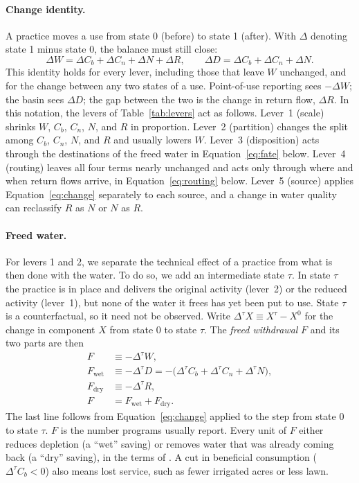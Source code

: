 \documentclass[11pt]{article}
\newcommand{\Cb}{C_b}                       %
\newcommand{\Cn}{C_n}                       %
\newcommand{\Fwet}{F_{\mathrm{wet}}}        %
\newcommand{\Fdry}{F_{\mathrm{dry}}}        %
\newcommand{\dtau}{\Delta^{\tau}}            %
\begin{document}
\paragraph{Change identity.} A practice moves a use from state 0 (before) to state 1 (after). With $\Delta$ denoting state 1 minus state 0, the balance must still close:
\begin{equation}\label{eq:change}
  \Delta W = \Delta \Cb + \Delta \Cn + \Delta N + \Delta R ,
  \qquad
  \Delta D = \Delta \Cb + \Delta \Cn + \Delta N .
\end{equation}
This identity holds for every lever, including those that leave $W$ unchanged, and for the change between any two states of a use. Point-of-use reporting sees $-\Delta W$; the basin sees $\Delta D$; the gap between the two is the change in return flow, $\Delta R$. In this notation, the levers of Table~\ref{tab:levers} act as follows. Lever~1 (scale) shrinks $W$, $\Cb$, $\Cn$, $N$, and $R$ in proportion. Lever~2 (partition) changes the split among $\Cb$, $\Cn$, $N$, and $R$ and usually lowers $W$. Lever~3 (disposition) acts through the destinations of the freed water in Equation~\eqref{eq:fate} below. Lever~4 (routing) leaves all four terms nearly unchanged and acts only through where and when return flows arrive, in Equation~\eqref{eq:routing} below. Lever~5 (source) applies Equation~\eqref{eq:change} separately to each source, and a change in water quality can reclassify $R$ as $N$ or $N$ as $R$.

\paragraph{Freed water.} For levers 1 and 2, we separate the technical effect of a practice from what is then done with the water. To do so, we add an intermediate state $\tau$. In state $\tau$ the practice is in place and delivers the original activity (lever~2) or the reduced activity (lever~1), but none of the water it frees has yet been put to use. State $\tau$ is a counterfactual, so it need not be observed. Write $\dtau X \equiv X^{\tau} - X^{0}$ for the change in component $X$ from state 0 to state $\tau$. The \emph{freed withdrawal} $F$ and its two parts are then
\begin{equation}\label{eq:freed}
\begin{aligned}
  F     &\equiv -\dtau W , \\
  \Fwet &\equiv -\dtau D = -\big(\dtau \Cb + \dtau \Cn + \dtau N\big) , \\
  \Fdry &\equiv -\dtau R , \\
  F     &= \Fwet + \Fdry .
\end{aligned}
\end{equation}
The last line follows from Equation~\eqref{eq:change} applied to the step from state 0 to state $\tau$. $F$ is the number programs usually report. Every unit of $F$ either reduces depletion (a ``wet'' saving) or removes water that was already coming back (a ``dry'' saving), in the terms of \citet{seckler1996}. A cut in beneficial consumption ($\dtau \Cb < 0$) also means lost service, such as fewer irrigated acres or less lawn.
\end{document}
